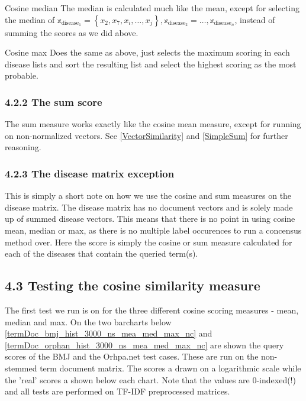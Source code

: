 Cosine median
The median is calculated much like the mean, except for selecting the median of $\mathbb{x}_{\textrm{disease}_{1}} = \left\{x_2,x_7, x_i, \dots, x_j\right\}, \mathbb{x}_{\textrm{disease}_{2}} = \dots, \mathbb{x}_{\textrm{disease}_{n}}$, instead of summing the scores as we did above. 

Cosine max
Does the same as above, just selects the maximum scoring in each disease lists and sort the resulting list and select the highest scoring as the most probable.

\subsubsection{4.2.2 The sum score}

The sum measure works exactly like the cosine mean measure, except for running on non-normalized vectors. See \ref{VectorSimilarity} and \ref{SimpleSum} for further reasoning.

\subsubsection{4.2.3 The disease matrix exception}

This is simply a short note on how we use the cosine and sum measures on the disease matrix. The disease matrix has no document vectors and is solely made up of summed disease vectors. This means that there is no point in using cosine mean, median or max, as there is no multiple label occurences to run a concensus method over. Here the score is simply the cosine or sum measure calculated for each of the diseases that contain the queried term(s).

\subsection{4.3 Testing the cosine similarity measure\label{TestingCosineSimilarity}}

The first test we run is on for the three different cosine scoring measures - mean, median and max. On the two barcharts below \ref{termDoc_bmj_hist_3000_ns_mea_med_max_nc} and \ref{termDoc_orphan_hist_3000_ns_mea_med_max_nc} are shown the query scores of the BMJ and the Orhpa.net test cases. These are run on the non-stemmed term document matrix. The scores a drawn on a logarithmic scale while the 'real' scores a shown below each chart. Note that the values are 0-indexed(!) and all tests are performed on TF-IDF preprocessed matrices.


